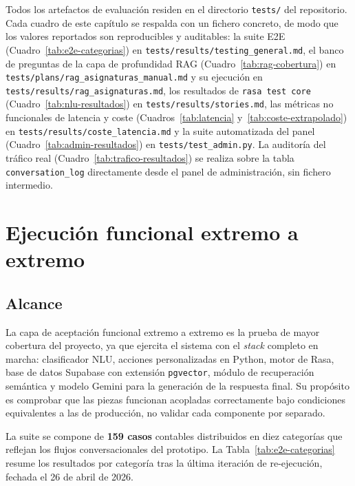 Todos los artefactos de evaluación residen en el directorio \texttt{tests/} del repositorio. Cada cuadro de este capítulo se respalda con un fichero concreto, de modo que los valores reportados son reproducibles y auditables: la suite E2E (Cuadro~\ref{tab:e2e-categorias}) en \texttt{tests/results/testing\_general.md}, el banco de preguntas de la capa de profundidad RAG (Cuadro~\ref{tab:rag-cobertura}) en \texttt{tests/plans/rag\_asignaturas\_manual.md} y su ejecución en \texttt{tests/results/rag\_asignaturas.md}, los resultados de \texttt{rasa test core} (Cuadro~\ref{tab:nlu-resultados}) en \texttt{tests/results/stories.md}, las métricas no funcionales de latencia y coste (Cuadros~\ref{tab:latencia} y~\ref{tab:coste-extrapolado}) en \texttt{tests/results/coste\_latencia.md} y la suite automatizada del panel (Cuadro~\ref{tab:admin-resultados}) en \texttt{tests/test\_admin.py}. La auditoría del tráfico real (Cuadro~\ref{tab:trafico-resultados}) se realiza sobre la tabla \texttt{conversation\_log} directamente desde el panel de administración, sin fichero intermedio.

\section{Ejecución funcional extremo a extremo}\label{sec:pruebas-e2e}

\subsection{Alcance}\label{subsec:e2e-alcance}

La capa de aceptación funcional extremo a extremo es la prueba de mayor cobertura del proyecto, ya que ejercita el sistema con el \textit{stack} completo en marcha: clasificador NLU, acciones personalizadas en Python, motor de Rasa, base de datos Supabase con extensión \texttt{pgvector}, módulo de recuperación semántica y modelo Gemini para la generación de la respuesta final. Su propósito es comprobar que las piezas funcionan acopladas correctamente bajo condiciones equivalentes a las de producción, no validar cada componente por separado.

La suite se compone de \textbf{159 casos} contables distribuidos en diez categorías que reflejan los flujos conversacionales del prototipo. La Tabla~\ref{tab:e2e-categorias} resume los resultados por categoría tras la última iteración de re-ejecución, fechada el 26 de abril de 2026.

